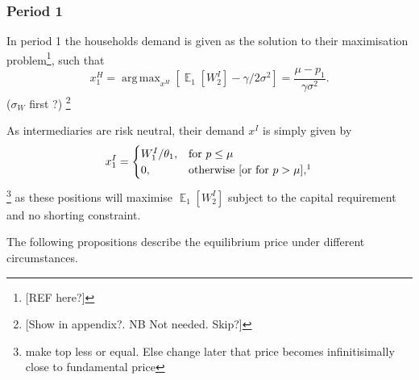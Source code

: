 \documentclass[11pt]{article}
\DeclareMathOperator{\E}{\mathbb{E}} %
\DeclareMathOperator*{\argmax}{arg\,max} %
\begin{document}
\subsubsection*{Period 1}
In period 1 the households demand is given as the solution to their maximisation problem\footnote{[REF here?]}, such that
\begin{equation} \label{e_xH}
x^{H}_1 = \argmax_{x^H}\left[\E_1[W^I_2] - \gamma/2\sigma^2\right]
= \frac{\mu - p_1}{\gamma\sigma^2}.
\end{equation}
($\sigma_W$ first ?)
\footnote{[Show in appendix?. NB Not needed. Skip?]}


As intermediaries are risk neutral, their demand $x^I$ is simply given by
\begin{equation}  \label{e_xI}
x^I_1 = \begin{cases}
 W^I_1/\theta_1, &\text{for $p \leq \mu$}\\
 0, &\text{otherwise [or for $p > \mu$],\footnotemark}
\end{cases}
\end{equation}
 \footnote{make top less or equal. Else change later that price becomes infinitisimally close to fundamental price}
\noindent as these positions will maximise $\E_1[W^I_2]$ subject to the capital requirement and no shorting constraint.

The following propositions describe the equilibrium price under different circumstances.
\end{document}
